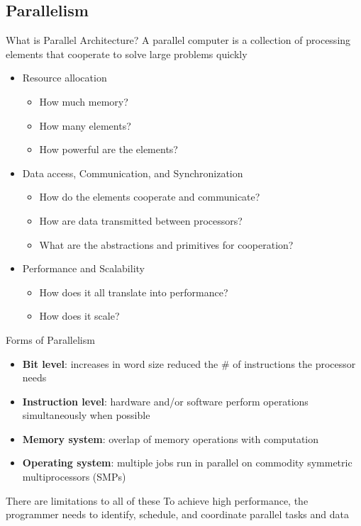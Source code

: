 \documentclass[xcolor=x11names,compress]{beamer}
\renewcommand{\(}{\begin{columns}}
\renewcommand{\)}{\end{columns}}
\newcommand{\<}[1]{\begin{column}{#1}}
\renewcommand{\>}{\end{column}}
\begin{document}
\subsection{Parallelism}
\begin{frame}{What is Parallel Architecture?}
A \textcolor{dgreen}{parallel computer} is a collection of processing elements that cooperate to solve large problems
quickly

\begin{itemize}
\item Resource allocation
  \begin{itemize}
  \item How much \textcolor{dgreen}{memory}?
  \item How \textcolor{dgreen}{many} elements?
  \item How \textcolor{dgreen}{powerful} are the elements?
  \end{itemize}
\item Data access, Communication, and Synchronization
  \begin{itemize}
  \item How do the elements cooperate and \textcolor{dgreen}{communicate}?
  \item How are \textcolor{dgreen}{data transmitted} between processors?
  \item What are the \textcolor{dgreen}{abstractions} and primitives for cooperation?
  \end{itemize}
\item Performance and Scalability
  \begin{itemize}
  \item How does it all translate into \textcolor{dgreen}{performance}?
  \item How does it \textcolor{dgreen}{scale}?
  \end{itemize}
\end{itemize}

\end{frame}

\begin{frame}{Forms of Parallelism}
\begin{itemize}
\item \textbf{Bit level}: increases in word size reduced the \# of instructions the processor needs
\item \textbf{Instruction level}: hardware and/or software perform operations simultaneously when possible
\item \textbf{Memory system}: overlap of memory operations with computation
\item \textbf{Operating system}: multiple jobs run in parallel on commodity symmetric multiprocessors (SMPs) 
\end{itemize}
There are limitations to all of these
\vspace*{1.5 em}
To achieve high performance, the programmer needs to identify, schedule, and coordinate parallel tasks and data

\end{frame}
\end{document}

